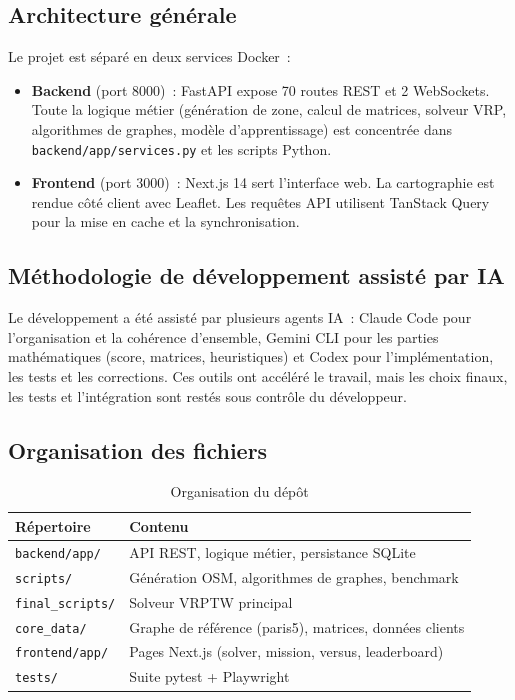 \documentclass[a4paper, 12pt, twoside]{article}
\begin{document}
\subsection{Architecture g\'{e}n\'{e}rale}

Le projet est s\'{e}par\'{e} en deux services Docker~:
\begin{itemize}
  \item \textbf{Backend} (port 8000)~: FastAPI expose 70 routes REST et 2 WebSockets.
        Toute la logique m\'{e}tier (g\'{e}n\'{e}ration de zone, calcul de matrices, solveur VRP,
        algorithmes de graphes, mod\`{e}le d'apprentissage) est concentr\'{e}e dans
        \texttt{backend/app/services.py} et les scripts Python.
  \item \textbf{Frontend} (port 3000)~: Next.js 14 sert l'interface web. La cartographie
        est rendue c\^{o}t\'{e} client avec Leaflet. Les requ\^{e}tes API utilisent TanStack Query
        pour la mise en cache et la synchronisation.
\end{itemize}

\subsection{M\'{e}thodologie de d\'{e}veloppement assist\'{e} par IA}

Le d\'{e}veloppement a \'{e}t\'{e} assist\'{e} par plusieurs agents IA~: Claude Code pour
l'organisation et la coh\'{e}rence d'ensemble, Gemini CLI pour les parties math\'{e}matiques
(score, matrices, heuristiques) et Codex pour l'impl\'{e}mentation, les tests et les
corrections. Ces outils ont acc\'{e}l\'{e}r\'{e} le travail, mais les choix finaux, les tests
et l'int\'{e}gration sont rest\'{e}s sous contr\^{o}le du d\'{e}veloppeur.

\subsection{Organisation des fichiers}

\begin{table}[h]
  \begin{center}
    \begin{tabular}{|l|l|}
      \hline
      \textbf{R\'{e}pertoire} & \textbf{Contenu} \\
      \hline
      \texttt{backend/app/} & API REST, logique m\'{e}tier, persistance SQLite \\
      \texttt{scripts/} & G\'{e}n\'{e}ration OSM, algorithmes de graphes, benchmark \\
      \texttt{final\_scripts/} & Solveur VRPTW principal \\
      \texttt{core\_data/} & Graphe de r\'{e}f\'{e}rence (paris5), matrices, donn\'{e}es clients \\
      \texttt{frontend/app/} & Pages Next.js (solver, mission, versus, leaderboard) \\
      \texttt{tests/} & Suite pytest + Playwright \\
      \hline
    \end{tabular}
  \end{center}
  \caption{Organisation du d\'{e}p\^{o}t}
  \label{tab:structure}
\end{table}
\end{document}
